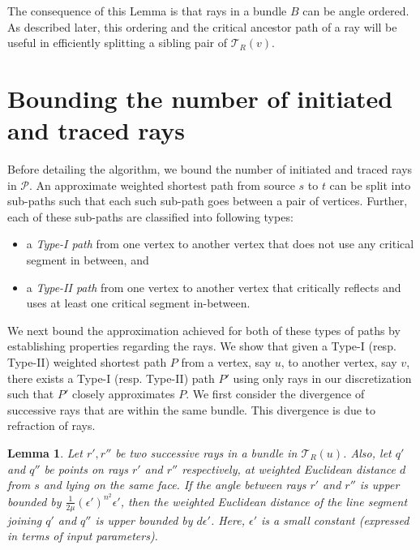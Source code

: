 \documentclass[11pt]{article}
\def\calT{\mathcal{T}}
\newtheorem{lemma}{Lemma}[section]
\begin{document}
The consequence of this Lemma is that  rays in a bundle $B$ can be angle ordered. 
As described later, this ordering and the critical ancestor path of a ray will be useful in efficiently splitting a sibling pair of $\calT_{R}(v)$.




\section{Bounding the number of initiated and traced rays}
\label{sect:boundrays}

Before detailing the algorithm, we bound the number of initiated and traced rays in $\mathcal{P}$.
An approximate weighted shortest path from source $s$ to $t$ can be split into sub-paths such that each such sub-path goes between a pair of vertices. 
Further, each of these sub-paths are classified into following types:

\begin{itemize}
\item
a {\it Type-I path} from one vertex to another vertex that does not use any critical segment in between, and

\item
a {\it Type-II path} from one vertex to another vertex that critically reflects and uses at least one critical segment in-between.
\end{itemize}

We next bound the approximation achieved for both of these types of paths by establishing properties regarding the rays.
We show that given a Type-I (resp. Type-II) weighted shortest path $P$ from a vertex, say $u$, to another vertex, say $v$, there exists a Type-I (resp. Type-II) path $P'$ using only rays in our discretization such that $P'$ closely approximates $P$.
We first consider the divergence of successive rays that are within the same bundle. 
This divergence is due to refraction of rays. 


\begin{lemma}
\label{lem:depsilon}
Let $r', r''$ be two successive rays in a bundle in $\calT_R(u)$.
Also, let $q'$ and $q''$ be points on rays $r'$ and $r''$ respectively, at weighted Euclidean distance $d$ from $s$ and lying on the same face.
If the angle between rays $r'$ and $r''$ is upper bounded by $\frac{1}{2\mu}(\epsilon')^{n^2}\epsilon'$, then the weighted Euclidean distance of the line segment joining $q'$ and $q''$ is upper bounded by $d \epsilon'$. 
Here, $\epsilon'$ is a small constant (expressed in terms of input parameters).
\end{lemma}
\end{document}
